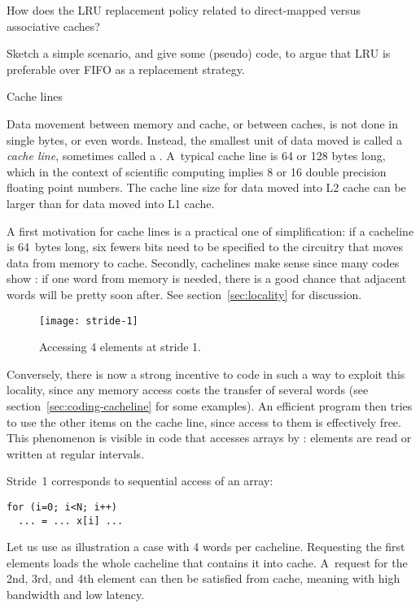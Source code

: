 
\begin{exercise}
  How does the LRU replacement policy related to direct-mapped versus
  associative caches?
\end{exercise}

\begin{exercise}
  Sketch a simple scenario, and give some (pseudo) code, to argue that
  LRU is preferable over FIFO as a replacement strategy.
\end{exercise}


 {Cache lines}
\label{sec:cacheline}\label{sec:stride}


Data movement between memory and cache, or between caches, is not done
in single bytes, or even words. Instead, the smallest unit of data
moved is called a \emph{cache line}, sometimes called a
.  A~typical cache line is 64 or 128 bytes
long, which in the context of scientific computing implies 8 or 16
double precision floating point numbers. The cache line size for data
moved into L2 cache can be larger than for data moved into L1 cache.

A first motivation for cache lines is a practical one
of simplification:
if a cacheline is 64~bytes long, six fewers bits
need to be specified to the circuitry that moves data from memory
to cache.
Secondly, cachelines make sense since many
codes show :
if one word from memory is needed, there is a good chance that
adjacent words will be pretty soon after.
See section~\ref{sec:locality} for discussion.

\begin{wrapfigure}{r}{3in}
  \texttt{[image: stride-1]}
  \caption{Accessing 4 elements at stride 1.}
  \label{fig:stride-1}
\end{wrapfigure}
%
Conversely, there is now a strong incentive to code in such a way to
exploit this locality,
since any memory access costs the transfer of several words (see
section~\ref{sec:coding-cacheline} for some examples). An
efficient program then tries to use the other items on the cache line,
since access to them is effectively free. This phenomenon is visible in
code that accesses arrays by : elements are read or
written at regular intervals.

Stride~1 corresponds to sequential access of an array:
\begin{lstlisting}
for (i=0; i<N; i++)
  ... = ... x[i] ...
\end{lstlisting}
Let us use as illustration a case with 4 words per cacheline. Requesting
the first elements loads the whole cacheline that contains it into
cache. A~request for the 2nd, 3rd, and 4th element can then be
satisfied from cache, meaning with high bandwidth and low latency.
\bigskip

